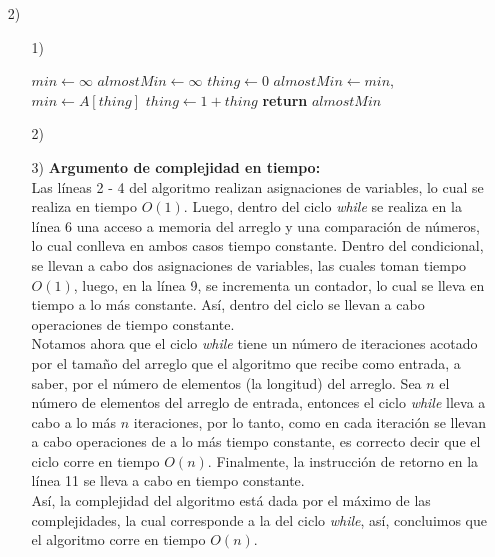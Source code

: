 \documentclass[a4paper, 12pt]{report}
\begin{document}
\begin{enumerate}
\item[2)]{
\begin{enumerate}
    \item[1)]{
        \begin{algorithmic}[1]
            \State $min\gets \infty$
            \State $almostMin\gets \infty$
            \State $thing\gets 0$
                    \State $almostMin\gets min$, $min\gets A[thing]$
                \EndIf
                \State $thing\gets 1 + thing$
            \EndWhile\label{euclidendwhile}
            \State \textbf{return} $almostMin$
            \EndProcedure
        \end{algorithmic}
    }
    \item[2)]{}
    \item[3)]{\bf Argumento de complejidad en tiempo:\\}
        Las líneas 2 - 4 del algoritmo realizan asignaciones de variables, lo
        cual se realiza en tiempo $O(1)$. Luego, dentro del ciclo {\it while}
        se realiza en la línea 6 una acceso a memoria del arreglo y una
        comparación de números, lo cual conlleva en ambos casos tiempo
        constante. Dentro del condicional, se llevan a cabo dos asignaciones
        de variables, las cuales toman tiempo $O(1)$, luego, en la línea
        9, se incrementa un contador, lo cual se lleva en tiempo a lo más
        constante. Así, dentro del ciclo se llevan a cabo operaciones
        de tiempo constante.\\
        Notamos ahora que el ciclo {\it while} tiene un número de iteraciones
        acotado por el tamaño del arreglo que el algoritmo que recibe como
        entrada, a saber, por el número de elementos (la longitud) del arreglo.
        Sea $n$ el número de elementos del arreglo de entrada, entonces el ciclo
        {\it while} lleva a cabo a lo más $n$ iteraciones, por lo tanto,
        como en cada iteración se llevan a cabo operaciones de a lo más tiempo
        constante, es correcto decir que el ciclo corre en tiempo $O(n)$.
        Finalmente, la instrucción de retorno en la línea 11 se lleva a cabo en
        tiempo constante.\\
        Así, la complejidad del algoritmo está dada por el máximo de las
        complejidades, la cual corresponde a la del ciclo {\it while}, así,
        concluimos que el algoritmo corre en tiempo $O(n)$.



\end{enumerate}}
\end{enumerate}
\end{document}
